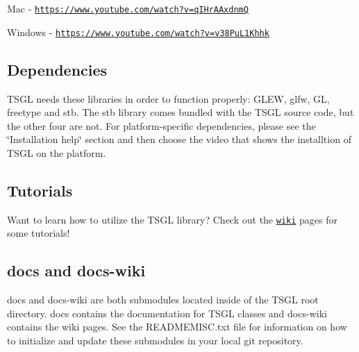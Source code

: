 Mac -\/ \href{https://www.youtube.com/watch?v=qIHrAAxdnmQ}{\tt https\-://www.\-youtube.\-com/watch?v=q\-I\-Hr\-A\-Axdnm\-Q}

Windows -\/ \href{https://www.youtube.com/watch?v=v38PuL1Khhk}{\tt https\-://www.\-youtube.\-com/watch?v=v38\-Pu\-L1\-Khhk} 

 \subsection*{Dependencies }

T\-S\-G\-L needs these libraries in order to function properly\-: G\-L\-E\-W, glfw, G\-L, freetype and stb. The stb library comes bundled with the T\-S\-G\-L source code, but the other four are not. For platform-\/specific dependencies, please see the \char`\"{}\-Installation help\char`\"{} section and then choose the video that shows the installtion of T\-S\-G\-L on the platform. 

 \subsection*{Tutorials }

Want to learn how to utilize the T\-S\-G\-L library? Check out the \href{https://github.com/Calvin-CS/TSGL/wiki}{\tt wiki} pages for some tutorials! 

 \subsection*{docs and docs-\/wiki }

docs and docs-\/wiki are both submodules located inside of the T\-S\-G\-L root directory. docs contains the documentation for T\-S\-G\-L classes and docs-\/wiki contains the wiki pages. See the R\-E\-A\-D\-M\-E\-M\-I\-S\-C.\-txt file for information on how to initialize and update these submodules in your local git repository. 